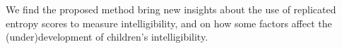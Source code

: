 \begin{comment}
	Third, given the complexity of the statistical procedure, we wrap the analysis under the Bayesian framework, providing the assumptions and steps required to reproduce the computational implementation of the models. The general reasons for using Bayesian statistics in our research are that the framework can handle all kinds of data-generating processes \cite{Fox_2010}, and it lends itself easily to complex and over-parameterized models \cite{Baker_1998, Kim_1999}, characteristics that define our implementation. Furthermore, although the framework have similar estimation capabilities as its frequentist counterpart \cite{Baker_1998, Hsieh_2010, Wollack_2002}, some specific scenarios in our current research also favors its use, i.e. the need of inferences with a small sample size \cite{Fox_2010, McElreath_2020, Skrondal_et_al_2004a}, and the need of confining some parameters in a permitted space \cite{Martin_et_al_1975}, e.g. variances confined to positive values. Moreover, since the main output of Bayesian statistics are not point estimates, but rather the posterior distribution of the parameters' possible values \cite{McElreath_2020}, the framework allow us to have a more nuanced view of our inferences and conclusions.

\end{comment}
	
We find the proposed method bring new insights about the use of replicated entropy scores to measure intelligibility, and on how some factors affect the (under)development of children's intelligibility.

\begin{comment}
	
	Fourth, we implement all of the above in a data set consisting of repeated entropy measures, with the purpose of determine which factors affect the \textit{speech intelligibility} levels of normal hearing (NH) versus hearing-impaired children with cochlear implants (HI/CI). The entropy measures were calculated using the transcriptions of one hundred language students from the University of Antwerp, where each student transcribed the stimuli to the Qualtrics environment \cite{Qualtrics_2005}. The stimuli consisted in ten utterances recordings for each of the thirty two NH and HI/CI children, selected from a large corpus of \textit{spontaneously spoken speech} collected by the Computational Linguistic and Psycholinguistics Research Centre (CLiPS).
	
\end{comment}

